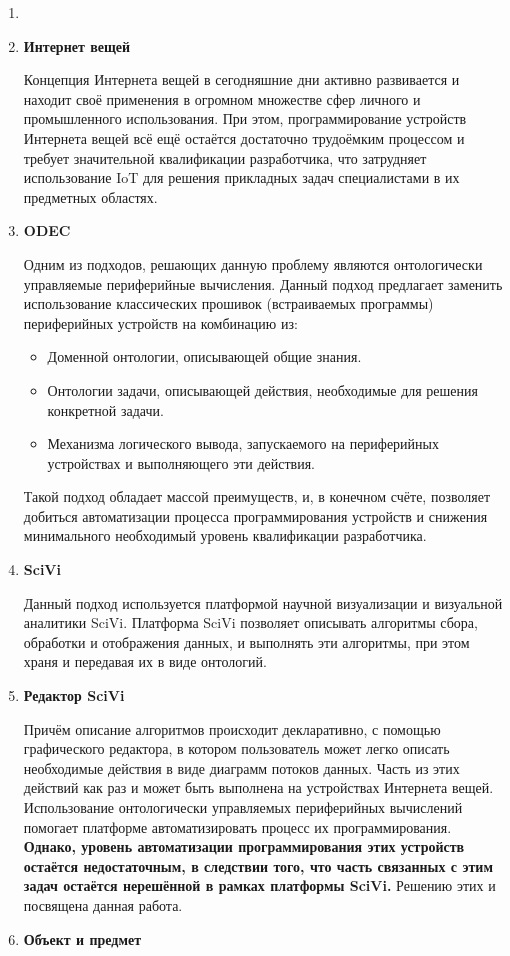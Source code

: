 \documentclass[14pt]{extarticle}
\begin{document}
\begin{enumerate}
	\item \textbf{}
	\item \textbf{Интернет вещей}

	Концепция Интернета вещей в сегодняшние дни активно развивается и находит своё применения в огромном множестве сфер личного и промышленного использования.
	При этом, программирование устройств Интернета вещей всё ещё остаётся достаточно трудоёмким процессом и требует значительной квалификации разработчика, что затрудняет использование IoT для решения прикладных задач специалистами в их предметных областях.
	\item \textbf{ODEC}

	Одним из подходов, решающих данную проблему являются онтологически управляемые периферийные вычисления.
	Данный подход предлагает заменить использование классических прошивок (встраиваемых программы) периферийных устройств на комбинацию из:
	\begin{itemize}
		\item Доменной онтологии, описывающей общие знания.
		\item Онтологии задачи, описывающей действия, необходимые для решения конкретной задачи.
		\item Механизма логического вывода, запускаемого на периферийных устройствах и выполняющего эти действия.
	\end{itemize}
	Такой подход обладает массой преимуществ, и, в конечном счёте, позволяет добиться автоматизации процесса программирования устройств и снижения минимального необходимый уровень квалификации разработчика.
	\item \textbf{SciVi}

	Данный подход используется платформой научной визуализации и визуальной аналитики SciVi.
	Платформа SciVi позволяет описывать алгоритмы сбора, обработки и отображения данных, и выполнять эти алгоритмы, при этом храня и передавая их в виде онтологий.
	\item \textbf{Редактор SciVi}

	Причём описание алгоритмов происходит декларативно, с помощью графического редактора, в котором пользователь может легко описать необходимые действия в виде диаграмм потоков данных.
	Часть из этих действий как раз и может быть выполнена на устройствах Интернета вещей.
	Использование онтологически управляемых периферийных вычислений помогает платформе автоматизировать процесс их программирования.
	\textbf{Однако, уровень автоматизации программирования этих устройств остаётся недостаточным, в следствии того, что часть связанных с этим задач остаётся нерешённой в рамках платформы SciVi.}
	Решению этих и посвящена данная работа.
	\item \textbf{Объект и предмет}


\end{enumerate}
\end{document}
